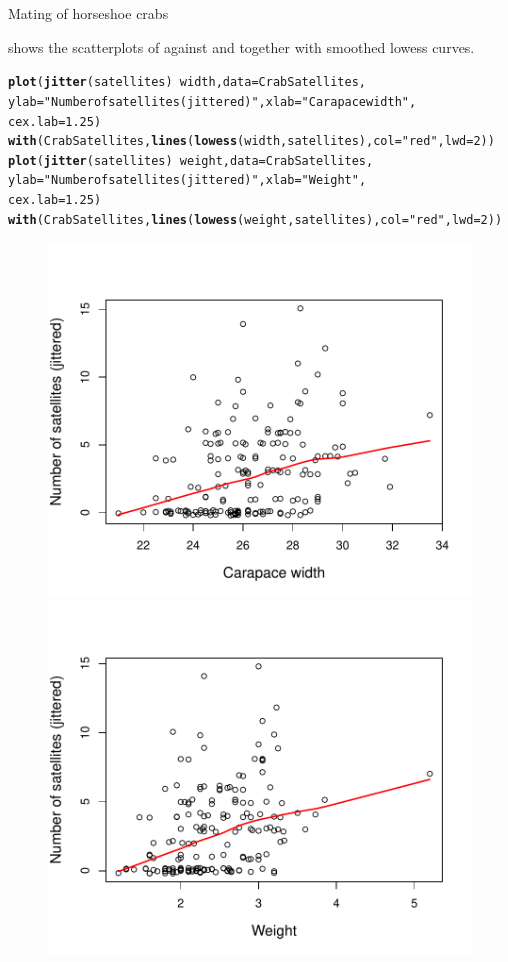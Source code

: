 \documentclass[11pt]{book}\usepackage[]{graphicx}\usepackage[]{color}
\makeatletter
\newcommand{\hlnum}[1]{\textcolor[rgb]{0.686,0.059,0.569}{#1}}%
\newcommand{\hlstr}[1]{\textcolor[rgb]{0.192,0.494,0.8}{#1}}%
\newcommand{\hlopt}[1]{\textcolor[rgb]{0,0,0}{#1}}%
\newcommand{\hlstd}[1]{\textcolor[rgb]{0.345,0.345,0.345}{#1}}%
\newcommand{\hlkwc}[1]{\textcolor[rgb]{0.333,0.667,0.333}{#1}}%
\newcommand{\hlkwd}[1]{\textcolor[rgb]{0.737,0.353,0.396}{\textbf{#1}}}%
\newenvironment{kframe}{%
 \def\at@end@of@kframe{}%
 \ifinner\ifhmode%
  \def\at@end@of@kframe{\end{minipage}}%
  \begin{minipage}{\columnwidth}%
 \fi\fi%
 \def\FrameCommand##1{\hskip\@totalleftmargin \hskip-\fboxsep
 \colorbox{shadecolor}{##1}\hskip-\fboxsep
     \hskip-\linewidth \hskip-\@totalleftmargin \hskip\columnwidth}%
 \MakeFramed {\advance\hsize-\width
   \@totalleftmargin\z@ \linewidth\hsize
   \@setminipage}}%
 {\par\unskip\endMakeFramed%
 \at@end@of@kframe}
\newenvironment{knitrout}{}{} %
\renewenvironment{knitrout}{\small\renewcommand{\baselinestretch}{.85}}{} %
\makeatother
\begin{document}
\begin{Example}[crabs1]{Mating of horseshoe crabs}
\begin{knitrout}
\end{knitrout}

 shows the scatterplots of  against  and 
together with smoothed lowess curves.  
\begin{knitrout}
\color{fgcolor}\begin{kframe}
\begin{alltt}
\hlkwd{plot}\hlstd{(}\hlkwd{jitter}\hlstd{(satellites)} \hlopt{~} \hlstd{width,} \hlkwc{data}\hlstd{=CrabSatellites,}
  \hlkwc{ylab}\hlstd{=}\hlstr{"Number of satellites (jittered)"}\hlstd{,} \hlkwc{xlab}\hlstd{=}\hlstr{"Carapace width"}\hlstd{,}
  \hlkwc{cex.lab}\hlstd{=}\hlnum{1.25}\hlstd{)}
\hlkwd{with}\hlstd{(CrabSatellites,} \hlkwd{lines}\hlstd{(}\hlkwd{lowess}\hlstd{(width, satellites),} \hlkwc{col}\hlstd{=}\hlstr{"red"}\hlstd{,} \hlkwc{lwd}\hlstd{=}\hlnum{2}\hlstd{))}
\hlkwd{plot}\hlstd{(}\hlkwd{jitter}\hlstd{(satellites)} \hlopt{~} \hlstd{weight,} \hlkwc{data}\hlstd{=CrabSatellites,}
  \hlkwc{ylab}\hlstd{=}\hlstr{"Number of satellites (jittered)"}\hlstd{,} \hlkwc{xlab}\hlstd{=}\hlstr{"Weight"}\hlstd{,}
  \hlkwc{cex.lab}\hlstd{=}\hlnum{1.25}\hlstd{)}
\hlkwd{with}\hlstd{(CrabSatellites,} \hlkwd{lines}\hlstd{(}\hlkwd{lowess}\hlstd{(weight, satellites),} \hlkwc{col}\hlstd{=}\hlstr{"red"}\hlstd{,} \hlkwc{lwd}\hlstd{=}\hlnum{2}\hlstd{))}
\end{alltt}
\end{kframe}\begin{figure}[!htbp]


\centerline{\includegraphics[width=.49\textwidth]{ch09/fig/crabs1-scats1} 
\includegraphics[width=.49\textwidth]{ch09/fig/crabs1-scats2} }


\end{figure}
\end{knitrout}
\end{Example}
\end{document}
